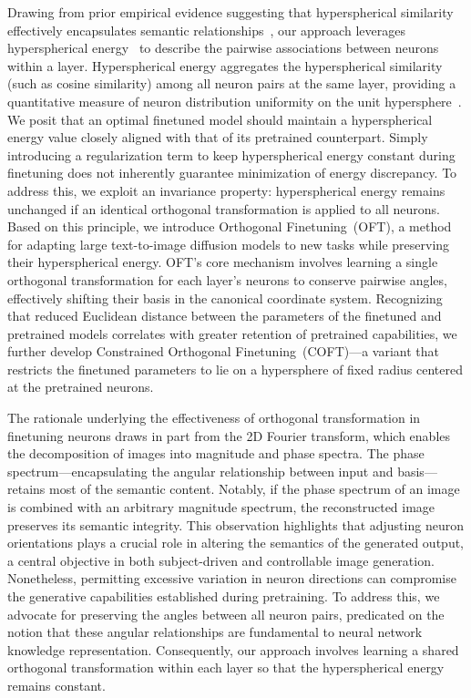 Drawing from prior empirical evidence suggesting that hyperspherical similarity effectively encapsulates semantic relationships~\cite{liu2017deep,liu2018decoupled,chen2020angular}, our approach leverages hyperspherical energy~\cite{liu2018learning} to describe the pairwise associations between neurons within a layer. Hyperspherical energy aggregates the hyperspherical similarity (such as cosine similarity) among all neuron pairs at the same layer, providing a quantitative measure of neuron distribution uniformity on the unit hypersphere~\cite{liu2021learning}. We posit that an optimal finetuned model should maintain a hyperspherical energy value closely aligned with that of its pretrained counterpart. Simply introducing a regularization term to keep hyperspherical energy constant during finetuning does not inherently guarantee minimization of energy discrepancy. To address this, we exploit an invariance property: hyperspherical energy remains unchanged if an identical orthogonal transformation is applied to all neurons. Based on this principle, we introduce Orthogonal Finetuning~(OFT), a method for adapting large text-to-image diffusion models to new tasks while preserving their hyperspherical energy. OFT’s core mechanism involves learning a single orthogonal transformation for each layer’s neurons to conserve pairwise angles, effectively shifting their basis in the canonical coordinate system. Recognizing that reduced Euclidean distance between the parameters of the finetuned and pretrained models correlates with greater retention of pretrained capabilities, we further develop Constrained Orthogonal Finetuning~(COFT)—a variant that restricts the finetuned parameters to lie on a hypersphere of fixed radius centered at the pretrained neurons.

The rationale underlying the effectiveness of orthogonal transformation in finetuning neurons draws in part from the 2D Fourier transform, which enables the decomposition of images into magnitude and phase spectra. The phase spectrum—encapsulating the angular relationship between input and basis—retains most of the semantic content. Notably, if the phase spectrum of an image is combined with an arbitrary magnitude spectrum, the reconstructed image preserves its semantic integrity. This observation highlights that adjusting neuron orientations plays a crucial role in altering the semantics of the generated output, a central objective in both subject-driven and controllable image generation. Nonetheless, permitting excessive variation in neuron directions can compromise the generative capabilities established during pretraining. To address this, we advocate for preserving the angles between all neuron pairs, predicated on the notion that these angular relationships are fundamental to neural network knowledge representation. Consequently, our approach involves learning a shared orthogonal transformation within each layer so that the hyperspherical energy remains constant.

